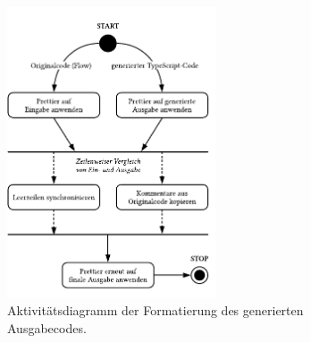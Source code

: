 \begin{figure}[htb]
  \centering
  \includegraphics[width=0.55\textwidth]{src/4_Umsetzung/fig/activity-diagram-formatting.pdf}
	\caption[Aktivitätsdiagramm der Formatierung des Ausgabecodes]{Aktivitätsdiagramm der Formatierung des generierten Ausgabecodes.}
	\label{fig:activity-diagram-formatting}
\end{figure}

